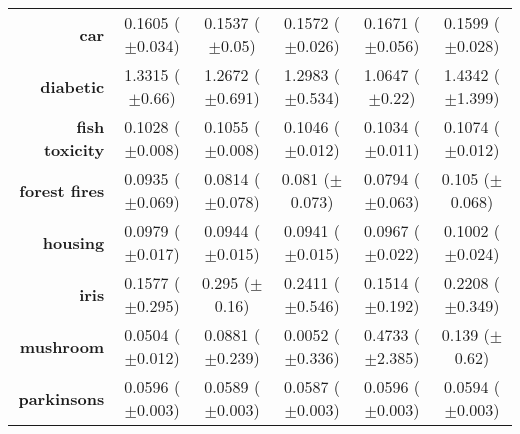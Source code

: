 \begin{table}[htbp]
{\begin{tabular}{r|ccccc}
			\textbf{car}                 & \cellcolor[rgb]{ 1,  .878,  .51}0.1605 ($\pm$0.034)     & \cellcolor[rgb]{ .388,  .745,  .482}0.1537 ($\pm$0.05)  & \cellcolor[rgb]{ .733,  .843,  .502}0.1572 ($\pm$0.026) & \cellcolor[rgb]{ .973,  .412,  .42}0.1671 ($\pm$0.056)  & \cellcolor[rgb]{ 1,  .922,  .518}0.1599 ($\pm$0.028)    \\
			\textbf{diabetic}            & \cellcolor[rgb]{ .996,  .8,  .494}1.3315 ($\pm$0.66)    & \cellcolor[rgb]{ .918,  .894,  .51}1.2672 ($\pm$0.691)  & \cellcolor[rgb]{ 1,  .922,  .518}1.2983 ($\pm$0.534)    & \cellcolor[rgb]{ .388,  .745,  .482}1.0647 ($\pm$0.22)  & \cellcolor[rgb]{ .973,  .412,  .42}1.4342 ($\pm$1.399)  \\
			\textbf{fish toxicity}       & \cellcolor[rgb]{ .388,  .745,  .482}0.1028 ($\pm$0.008) & \cellcolor[rgb]{ .992,  .749,  .486}0.1055 ($\pm$0.008) & \cellcolor[rgb]{ 1,  .922,  .518}0.1046 ($\pm$0.012)    & \cellcolor[rgb]{ .604,  .808,  .494}0.1034 ($\pm$0.011) & \cellcolor[rgb]{ .973,  .412,  .42}0.1074 ($\pm$0.012)  \\
			\textbf{forest fires}        & \cellcolor[rgb]{ .988,  .663,  .471}0.0935 ($\pm$0.069) & \cellcolor[rgb]{ 1,  .922,  .518}0.0814 ($\pm$0.078)    & \cellcolor[rgb]{ .863,  .882,  .51}0.081 ($\pm$0.073)   & \cellcolor[rgb]{ .388,  .745,  .482}0.0794 ($\pm$0.063) & \cellcolor[rgb]{ .973,  .412,  .42}0.105 ($\pm$0.068)   \\
			\textbf{housing}             & \cellcolor[rgb]{ .992,  .745,  .486}0.0979 ($\pm$0.017) & \cellcolor[rgb]{ .467,  .769,  .486}0.0944 ($\pm$0.015) & \cellcolor[rgb]{ .388,  .745,  .482}0.0941 ($\pm$0.015) & \cellcolor[rgb]{ 1,  .922,  .518}0.0967 ($\pm$0.022)    & \cellcolor[rgb]{ .973,  .412,  .42}0.1002 ($\pm$0.024)  \\
			\textbf{iris}                & \cellcolor[rgb]{ .443,  .761,  .482}0.1577 ($\pm$0.295) & \cellcolor[rgb]{ .973,  .412,  .42}0.295 ($\pm$0.16)    & \cellcolor[rgb]{ .996,  .784,  .494}0.2411 ($\pm$0.546) & \cellcolor[rgb]{ .388,  .745,  .482}0.1514 ($\pm$0.192) & \cellcolor[rgb]{ 1,  .922,  .518}0.2208 ($\pm$0.349)    \\
			\textbf{mushroom}            & \cellcolor[rgb]{ .722,  .839,  .498}0.0504 ($\pm$0.012) & \cellcolor[rgb]{ 1,  .922,  .518}0.0881 ($\pm$0.239)    & \cellcolor[rgb]{ .388,  .745,  .482}0.0052 ($\pm$0.336) & \cellcolor[rgb]{ .973,  .412,  .42}0.4733 ($\pm$2.385)  & \cellcolor[rgb]{ 1,  .855,  .506}0.139 ($\pm$0.62)      \\
			\textbf{parkinsons}          & \cellcolor[rgb]{ .973,  .412,  .42}0.0596 ($\pm$0.003)  & \cellcolor[rgb]{ .576,  .8,  .49}0.0589 ($\pm$0.003)    & \cellcolor[rgb]{ .388,  .745,  .482}0.0587 ($\pm$0.003) & \cellcolor[rgb]{ .976,  .424,  .424}0.0596 ($\pm$0.003) & \cellcolor[rgb]{ 1,  .922,  .518}0.0594 ($\pm$0.003)    \\

\end{tabular}}
\end{table}
